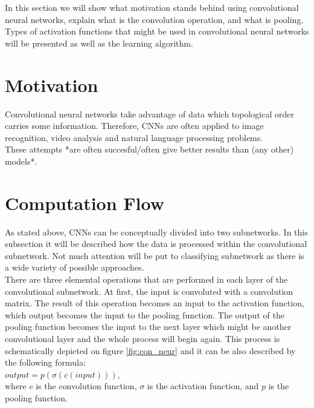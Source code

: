 \documentclass[a4paper,10pt]{report}
\begin{document}
      In this section we will show what motivation stands behind using convolutional neural networks, explain what is the convolution operation, and what is pooling. Types of activation functions that might be used in convolutional neural networks
      will be presented as well as the learning algorithm.\\
      
      \section{Motivation} %
	Convolutional neural networks take advantage of data which topological order carries some information. Therefore, CNNs are often applied to image recognition, video analysis and natural language processing problems.\\ %
	These attempts *are often succesful/often give better results than (any other) models*.\\ %
	
      
      \section{Computation Flow}
	As stated above, CNNs can be conceptually divided into two subnetworks. In this subsection it will be described how the data is processed within the convolutional subnetwork. Not much attention will be put to classifying subnetwork as there is a wide variety of possible approaches.\\
	
	There are three elemental operations that are performed in each layer of the convolutional subnetwork. At first, the input is convoluted with a convolution matrix. The result of this operation becomes an input to the activation function, which output becomes the input to the pooling function. The output of the pooling function becomes the input to the next layer which might be another convolutional layer and the whole process will begin again. This process is schematically depicted on figure \ref{fig:con_neur} and it can be also described by the following formula:\\
	
	$output = p(\sigma(c(input)))$,\\
	
	where $c$ is the convolution function, $\sigma$ is the activation function, and $p$ is the pooling function.\\
	
\end{document}
